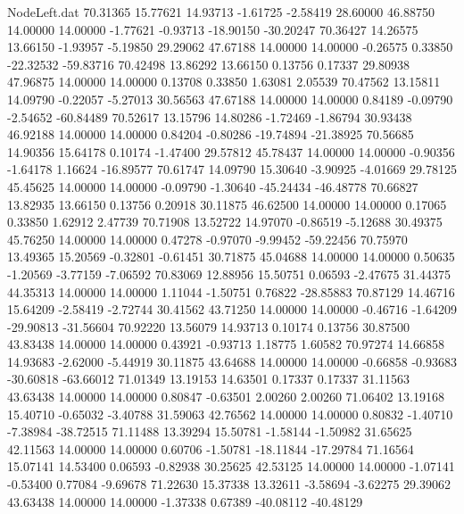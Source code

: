 \begin{filecontents}{NodeLeft.dat}
  70.31365   15.77621   14.93713    -1.61725   -2.58419   28.60000   46.88750   14.00000   14.00000   -1.77621   -0.93713  -18.90150  -30.20247
  70.36427   14.26575   13.66150    -1.93957   -5.19850   29.29062   47.67188   14.00000   14.00000   -0.26575    0.33850  -22.32532  -59.83716
  70.42498   13.86292   13.66150     0.13756    0.17337   29.80938   47.96875   14.00000   14.00000    0.13708    0.33850    1.63081    2.05539
  70.47562   13.15811   14.09790    -0.22057   -5.27013   30.56563   47.67188   14.00000   14.00000    0.84189   -0.09790   -2.54652  -60.84489
  70.52617   13.15796   14.80286    -1.72469   -1.86794   30.93438   46.92188   14.00000   14.00000    0.84204   -0.80286  -19.74894  -21.38925
  70.56685   14.90356   15.64178     0.10174   -1.47400   29.57812   45.78437   14.00000   14.00000   -0.90356   -1.64178    1.16624  -16.89577
  70.61747   14.09790   15.30640    -3.90925   -4.01669   29.78125   45.45625   14.00000   14.00000   -0.09790   -1.30640  -45.24434  -46.48778
  70.66827   13.82935   13.66150     0.13756    0.20918   30.11875   46.62500   14.00000   14.00000    0.17065    0.33850    1.62912    2.47739
  70.71908   13.52722   14.97070    -0.86519   -5.12688   30.49375   45.76250   14.00000   14.00000    0.47278   -0.97070   -9.99452  -59.22456
  70.75970   13.49365   15.20569    -0.32801   -0.61451   30.71875   45.04688   14.00000   14.00000    0.50635   -1.20569   -3.77159   -7.06592
  70.83069   12.88956   15.50751     0.06593   -2.47675   31.44375   44.35313   14.00000   14.00000    1.11044   -1.50751    0.76822  -28.85883
  70.87129   14.46716   15.64209    -2.58419   -2.72744   30.41562   43.71250   14.00000   14.00000   -0.46716   -1.64209  -29.90813  -31.56604
  70.92220   13.56079   14.93713     0.10174    0.13756   30.87500   43.83438   14.00000   14.00000    0.43921   -0.93713    1.18775    1.60582
  70.97274   14.66858   14.93683    -2.62000   -5.44919   30.11875   43.64688   14.00000   14.00000   -0.66858   -0.93683  -30.60818  -63.66012
  71.01349   13.19153   14.63501     0.17337    0.17337   31.11563   43.63438   14.00000   14.00000    0.80847   -0.63501    2.00260    2.00260
  71.06402   13.19168   15.40710    -0.65032   -3.40788   31.59063   42.76562   14.00000   14.00000    0.80832   -1.40710   -7.38984  -38.72515
  71.11488   13.39294   15.50781    -1.58144   -1.50982   31.65625   42.11563   14.00000   14.00000    0.60706   -1.50781  -18.11844  -17.29784
  71.16564   15.07141   14.53400     0.06593   -0.82938   30.25625   42.53125   14.00000   14.00000   -1.07141   -0.53400    0.77084   -9.69678
  71.22630   15.37338   13.32611    -3.58694   -3.62275   29.39062   43.63438   14.00000   14.00000   -1.37338    0.67389  -40.08112  -40.48129

\end{filecontents}
